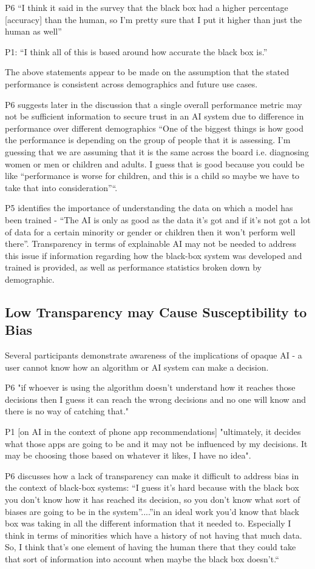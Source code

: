 \documentclass[manuscript,screen,review]{acmart}
\begin{document}
P6 “I think it said in the survey that the black box had a higher percentage [accuracy] than the human, so I'm pretty sure that I put it higher than just the human as well”

P1: “I think all of this is based around how accurate the black box is.” 

The above statements appear to be made on the assumption that the stated performance is consistent across demographics and future use cases.

P6 suggests later in the discussion that a single overall performance metric may not be sufficient information to secure trust in an AI system due to difference in performance over different demographics “One of the biggest things is how good the performance is depending on the group of people that it is assessing. I'm guessing that we are assuming that it is the same across the board i.e. diagnosing women or men or children and adults. I guess that is good because you could be like “performance is worse for children, and this is a child so maybe we have to take that into consideration”“. 

P5 identifies the importance of understanding the data on which a model has been trained -
 “The AI is only as good as the data it's got and if it's not got a lot of data for a certain minority or gender or children then it won't perform well there”. Transparency in terms of explainable AI may not be needed to address this issue if information regarding how the black-box system was developed and trained is provided, as well as performance statistics broken down by demographic.


\subsection{Low Transparency may Cause Susceptibility to Bias} 
Several participants demonstrate awareness of the implications of opaque AI - a user cannot know how an algorithm or AI system can make a decision.

P6  "if whoever is using the algorithm doesn’t understand how it reaches those decisions then I guess it can reach the wrong decisions and no one will know and there is no way of catching that." 

P1 [on AI in the context of phone app recommendations]  "ultimately, it decides what those apps are going to be and it may not be influenced by my decisions. It may be choosing those based on whatever it likes, I have no idea".

P6 discusses how a lack of transparency can make it difficult to address bias in the context of black-box systems: “I guess it's hard because with the black box you don’t know how it has reached its decision, so you don’t know what sort of biases are going to be in the system”....”in an ideal work you'd know that black box was taking in all the different information that it needed to. Especially I think in terms of minorities which have a history of not having that much data. So, I think that’s one element of having the human there that they could take that sort of information into account when maybe the black box doesn’t.“
\end{document}

